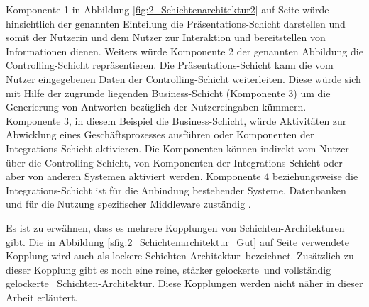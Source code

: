 Komponente 1 in Abbildung \ref{fig:2_Schichtenarchitektur2} auf Seite \pageref{fig:2_Schichtenarchitektur2} würde hinsichtlich der genannten Einteilung die Präsentations-Schicht darstellen und somit der Nutzerin und dem Nutzer zur Interaktion und bereitstellen von Informationen dienen. Weiters würde Komponente 2 der genannten Abbildung die Controlling-Schicht repräsentieren. Die Präsentations-Schicht kann die vom Nutzer eingegebenen Daten der Controlling-Schicht weiterleiten. Diese würde sich mit Hilfe der zugrunde liegenden Business-Schicht (Komponente 3) um die Generierung von Antworten bezüglich der Nutzereingaben kümmern. Komponente 3, in diesem Beispiel die Business-Schicht, würde Aktivitäten zur Abwicklung eines Geschäftsprozesses ausführen oder Komponenten der Integrations-Schicht aktivieren. Die Komponenten können indirekt vom Nutzer über die Controlling-Schicht, von Komponenten der Integrations-Schicht oder aber von anderen Systemen aktiviert werden. Komponente 4 beziehungsweise die Integrations-Schicht ist für die Anbindung bestehender Systeme, Datenbanken und für die Nutzung spezifischer Middleware zuständig \citereset \autocite[siehe][S. 22-25]{Andresen.2003}.

Es ist zu erwähnen, dass es mehrere Kopplungen von Schichten-Architekturen gibt. Die in Abbildung \ref{sfig:2_Schichtenarchitektur_Gut} auf Seite \pageref{sfig:2_Schichtenarchitektur_Gut} verwendete Kopplung wird auch als \glqq lockere Schichten-Architektur\grqq\ bezeichnet. Zusätzlich zu dieser Kopplung gibt es noch eine \glqq reine\grqq , \glqq stärker gelockerte\grqq\ und \glqq vollständig gelockerte \grqq\ Schichten-Architektur. Diese Kopplungen werden nicht näher in dieser Arbeit erläutert.